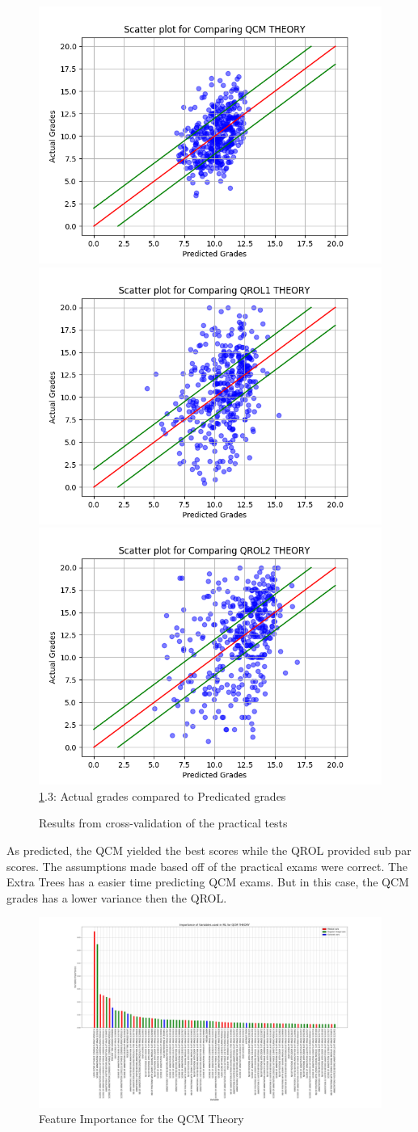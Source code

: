 \documentclass[a4paper,11pt]{report}
\numberwithin{figure}{section} %
\begin{document}
\begin{figure}[H]
      \includegraphics[width=.30\linewidth]{cv_comp_QCM_THEORY_2018-04-30_13_57_05.png}
      \includegraphics[width=.30\linewidth]{cv_comp_QROL1_THEORY_2018-04-30_13_40_50.png}
  	  \includegraphics[width=.30\linewidth]{cv_comp_QROL2_THEORY_2018-04-30_13_12_52.png}
      \\
      \ref{fig:results_theo}.3: Actual grades compared to Predicated grades
      \caption{Results from cross-validation of the practical tests}
      \label{fig:results_theo}
    \end{figure}
    
    As predicted, the QCM yielded the best scores while the QROL provided sub par scores.
    The assumptions made based off of the practical exams were correct.
    The Extra Trees has a easier time predicting QCM exams.
    But in this case, the QCM grades has a lower variance then the QROL.


     \begin{figure}[H]
      \centering
      \includegraphics[width=.95\linewidth]{var_importance_QCM_THEORY_2018-05-02_20_53_18.png}
      \caption{Feature Importance for the QCM Theory}
      \label{fig:var_th1}
      \end{figure}
      
\end{document}
